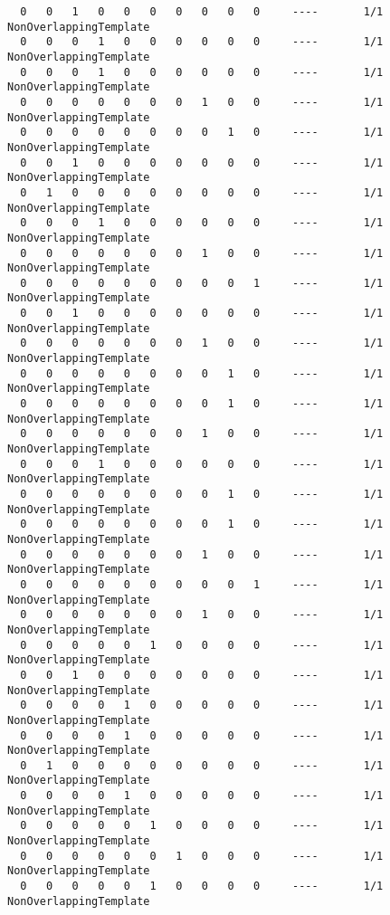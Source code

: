 \begin{code}
\begin{verbatim}
  0   0   1   0   0   0   0   0   0   0     ----       1/1       NonOverlappingTemplate
  0   0   0   1   0   0   0   0   0   0     ----       1/1       NonOverlappingTemplate
  0   0   0   1   0   0   0   0   0   0     ----       1/1       NonOverlappingTemplate
  0   0   0   0   0   0   0   1   0   0     ----       1/1       NonOverlappingTemplate
  0   0   0   0   0   0   0   0   1   0     ----       1/1       NonOverlappingTemplate
  0   0   1   0   0   0   0   0   0   0     ----       1/1       NonOverlappingTemplate
  0   1   0   0   0   0   0   0   0   0     ----       1/1       NonOverlappingTemplate
  0   0   0   1   0   0   0   0   0   0     ----       1/1       NonOverlappingTemplate
  0   0   0   0   0   0   0   1   0   0     ----       1/1       NonOverlappingTemplate
  0   0   0   0   0   0   0   0   0   1     ----       1/1       NonOverlappingTemplate
  0   0   1   0   0   0   0   0   0   0     ----       1/1       NonOverlappingTemplate
  0   0   0   0   0   0   0   1   0   0     ----       1/1       NonOverlappingTemplate
  0   0   0   0   0   0   0   0   1   0     ----       1/1       NonOverlappingTemplate
  0   0   0   0   0   0   0   0   1   0     ----       1/1       NonOverlappingTemplate
  0   0   0   0   0   0   0   1   0   0     ----       1/1       NonOverlappingTemplate
  0   0   0   1   0   0   0   0   0   0     ----       1/1       NonOverlappingTemplate
  0   0   0   0   0   0   0   0   1   0     ----       1/1       NonOverlappingTemplate
  0   0   0   0   0   0   0   0   1   0     ----       1/1       NonOverlappingTemplate
  0   0   0   0   0   0   0   1   0   0     ----       1/1       NonOverlappingTemplate
  0   0   0   0   0   0   0   0   0   1     ----       1/1       NonOverlappingTemplate
  0   0   0   0   0   0   0   1   0   0     ----       1/1       NonOverlappingTemplate
  0   0   0   0   0   1   0   0   0   0     ----       1/1       NonOverlappingTemplate
  0   0   1   0   0   0   0   0   0   0     ----       1/1       NonOverlappingTemplate
  0   0   0   0   1   0   0   0   0   0     ----       1/1       NonOverlappingTemplate
  0   0   0   0   1   0   0   0   0   0     ----       1/1       NonOverlappingTemplate
  0   1   0   0   0   0   0   0   0   0     ----       1/1       NonOverlappingTemplate
  0   0   0   0   1   0   0   0   0   0     ----       1/1       NonOverlappingTemplate
  0   0   0   0   0   1   0   0   0   0     ----       1/1       NonOverlappingTemplate
  0   0   0   0   0   0   1   0   0   0     ----       1/1       NonOverlappingTemplate
  0   0   0   0   0   1   0   0   0   0     ----       1/1       NonOverlappingTemplate

\end{verbatim}
\end{code}
